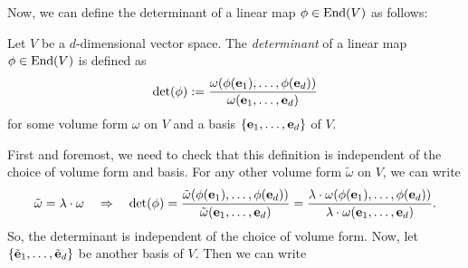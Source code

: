 Now, we can define the determinant of a linear map \(\phi \in \operatorname{End}(V)\) as follows:
\begin{definition}[Determinant]
    Let \(V\) be a \(d\)-dimensional vector space. The \emph{determinant} of a linear map \(\phi \in \operatorname{End}(V)\) is defined as
    \begin{equation}
        \det(\phi) := \frac{\omega(\phi(\vb{e}_1), \ldots, \phi(\vb{e}_d))}{\omega(\vb{e}_1, \ldots, \vb{e}_d)}
    \end{equation}
    for some volume form \(\omega\) on \(V\) and a basis \(\qty{\vb{e}_1, \ldots, \vb{e}_d}\) of \(V\).
\end{definition}
First and foremost, we need to check that this definition is independent of the choice of volume form and basis. For any other volume form \(\tilde{\omega}\) on \(V\), we can write
\begin{equation}
    \tilde{\omega} = \lambda \cdot \omega \quad \Rightarrow \quad \det(\phi) = \frac{\tilde{\omega}(\phi(\vb{e}_1), \ldots, \phi(\vb{e}_d))}{\tilde{\omega}(\vb{e}_1, \ldots, \vb{e}_d)} = \frac{\lambda \cdot \omega(\phi(\vb{e}_1), \ldots, \phi(\vb{e}_d))}{\lambda \cdot \omega(\vb{e}_1, \ldots, \vb{e}_d)}.
\end{equation}
So, the determinant is independent of the choice of volume form. Now, let \(\qty{\tilde{\vb{e}}_1, \ldots, \tilde{\vb{e}}_d}\) be another basis of \(V\). Then we can write
